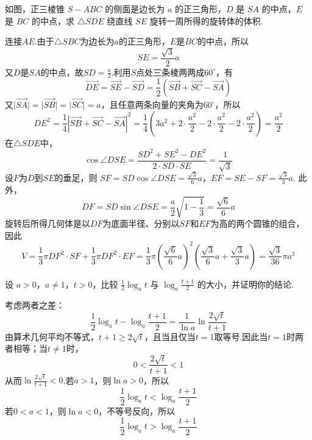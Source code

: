 \documentclass[UTF8,a4paper,oneside,11pt]{ctexbook}
\begin{document}
\begin{problem}

如图，正三棱锥 \(S-ABC\) 的侧面是边长为 \(a\) 的正三角形，\(D\) 是 \(SA\) 的中点，\(E\) 是 \(BC\) 的中点，求 \(\triangle SDE\) 绕直线 \(SE\) 旋转一周所得的旋转体的体积.
\end{problem}

\begin{solution}
连接\(AE\).由于\(\triangle SBC\)为边长为\(a\)的正三角形，\(E\)是\(BC\)的中点，所以
\[
SE=\frac{\sqrt3}{2}a
\]
又\(D\)是\(SA\)的中点，故\(SD=\frac a2\).利用\(S\)点处三条棱两两成\(60^{\circ}\)，有
\[
\overrightarrow{DE}=\overrightarrow{SE}-\overrightarrow{SD}
=\frac12\left(\overrightarrow{SB}+\overrightarrow{SC}-\overrightarrow{SA}\right)
\]
又\(\lvert\overrightarrow{SA}\rvert=\lvert\overrightarrow{SB}\rvert=\lvert\overrightarrow{SC}\rvert=a\)，且任意两条向量的夹角为\(60^{\circ}\)，所以
\[
DE^2=\frac14\left\lvert\overrightarrow{SB}+\overrightarrow{SC}-\overrightarrow{SA}\right\rvert^2
=\frac14\left(3a^2+2\cdot\frac{a^2}{2}-2\cdot\frac{a^2}{2}-2\cdot\frac{a^2}{2}\right)
=\frac{a^2}{2}
\]
在\(\triangle SDE\)中，
\[
\cos\angle DSE
=\frac{SD^2+SE^2-DE^2}{2\cdot SD\cdot SE}
=\frac{1}{\sqrt3}
\]
设\(F\)为\(D\)到\(SE\)的垂足，则
\(SF=SD\cos\angle DSE=\frac{\sqrt3}{6}a\)，\(EF=SE-SF=\frac{\sqrt3}{3}a\).
此外，
\[
DF=SD\sin\angle DSE
=\frac a2\sqrt{1-\frac13}=\frac{\sqrt6}{6}a
\]
旋转后所得几何体是以\(DF\)为底面半径、分别以\(SF\)和\(EF\)为高的两个圆锥的组合，因此
\[
V=\frac13\pi DF^2\cdot SF+\frac13\pi DF^2\cdot EF
=\frac13\pi\left(\frac{\sqrt6}{6}a\right)^2
\left(\frac{\sqrt3}{6}a+\frac{\sqrt3}{3}a\right)
=\frac{\sqrt3}{36}\pi a^3
\]
\end{solution}

\begin{problem}

设 \(a > 0\)，\(a \neq 1\)，\(t > 0\)，比较 \(\frac{1}{2} \log_a t\) 与 \(\log_a \frac{t + 1}{2}\) 的大小，并证明你的结论.
\end{problem}

\begin{solution}
考虑两者之差：
\[
\frac12\log_a t-\log_a\frac{t+1}{2}
=\frac{1}{\ln a}\ln\frac{2\sqrt t}{t+1}
\]
由算术几何平均不等式，\(t+1\ge2\sqrt t\)，且当且仅当\(t=1\)取等号.因此当\(t=1\)时两者相等；当\(t\ne1\)时，
\[
0<\frac{2\sqrt t}{t+1}<1
\]
从而\(\ln\frac{2\sqrt t}{t+1}<0\).若\(a>1\)，则\(\ln a>0\)，所以
\[
\frac12\log_a t<\log_a\frac{t+1}{2}
\]
若\(0<a<1\)，则\(\ln a<0\)，不等号反向，所以
\[
\frac12\log_a t>\log_a\frac{t+1}{2}
\]
\end{solution}
\end{document}
